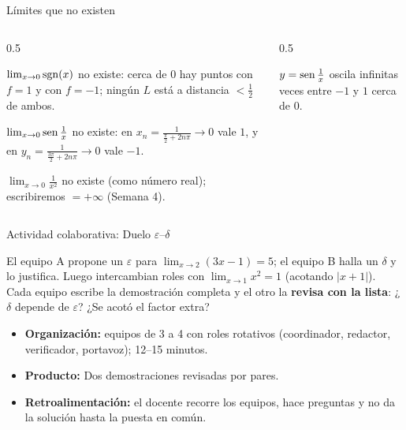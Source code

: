 \documentclass[10pt,aspectratio=169]{beamer}
\begin{document}
\begin{frame}{Límites que no existen}
  \begin{columns}
    \begin{column}{0.5\textwidth}
      \begin{ejemplo}[5: salto]
        $\lim_{x\to0}\operatorname{sgn}(x)$ no existe: cerca de $0$ hay puntos con $f=1$ y con $f=-1$; ningún $L$ está a distancia $<\frac12$ de ambos.
      \end{ejemplo}
      \begin{ejemplo}[6: oscilación]
        $\lim_{x\to0}\operatorname{sen}\frac1x$ no existe: en $x_n=\frac{1}{\frac\pi2+2n\pi}\to0$ vale $1$, y en $y_n=\frac1{\frac{3\pi}2+2n\pi}\to0$ vale $-1$.
      \end{ejemplo}
      \begin{ejemplo}[7: no acotada]
        $\lim_{x\to0}\frac1{x^2}$ no existe (como número real); escribiremos $=+\infty$ (Semana 4).
      \end{ejemplo}
    \end{column}
    \begin{column}{0.5\textwidth}
      \centering

      \small $y=\operatorname{sen}\frac1x$ oscila infinitas veces entre $-1$ y $1$ cerca de $0$.
    \end{column}
  \end{columns}
\end{frame}

\begin{frame}{Actividad colaborativa: Duelo $\varepsilon$--$\delta$}
  \small
  \begin{activa}
    El equipo A propone un $\varepsilon$ para $\lim_{x\to2}(3x-1)=5$; el equipo B halla un $\delta$ y lo justifica. Luego intercambian roles con $\lim_{x\to1}x^2=1$ (acotando $|x+1|$). Cada equipo escribe la demostración completa y el otro la \textbf{revisa con la lista}: ¿$\delta$ depende de $\varepsilon$? ¿Se acotó el factor extra?
  \end{activa}
  \begin{itemize}
    \item \textbf{Organización:} equipos de 3 a 4 con roles rotativos (coordinador, redactor, verificador, portavoz); 12--15 minutos.
    \item \textbf{Producto:} Dos demostraciones revisadas por pares.
    \item \textbf{Retroalimentación:} el docente recorre los equipos, hace preguntas y no da la solución hasta la puesta en común.
  \end{itemize}
\end{frame}
\end{document}
